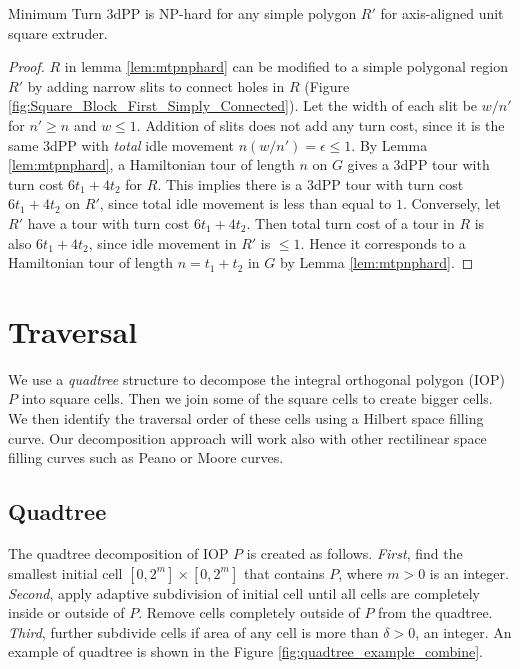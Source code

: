 \begin{cor} \label{cor:nphardsplpoly}
  Minimum Turn 3dPP is NP-hard for any simple polygon $R'$ for axis-aligned unit square extruder.
\end{cor}
\begin{proof}
  $R$ in lemma \ref{lem:mtpnphard} can be modified to a simple polygonal region $R'$ by adding narrow slits to connect holes in $R$ (Figure \ref{fig:Square_Block_First_Simply_Connected}).
  Let the width of each slit be $w/n'$ for $n' \geq n$ and $w \leq 1$.
  Addition of slits does not add any turn cost, since it is the same 3dPP with {\it total} idle movement $n(w/n') = \epsilon \leq 1$. 
  By Lemma \ref{lem:mtpnphard}, a Hamiltonian tour of length $n$ on $G$ gives a 3dPP tour with turn cost $6t_1 + 4t_2 $ for $R$. 
  This implies there is a 3dPP tour with turn cost $6t_1 + 4t_2$ on $R'$, since total idle movement is less than equal to $1$.
  Conversely, let $R'$ have a tour with turn cost $6t_1 + 4t_2$.
  Then total turn cost of a tour in $R$ is also $6t_1 + 4t_2$, since idle movement in $R'$ is $\leq 1$. 
  Hence it corresponds to a Hamiltonian tour of length $n = t_1 + t_2$ in $G$ by Lemma \ref{lem:mtpnphard}.
\end{proof}
\section{Traversal} \label{sec:travseral}

We use a {\it quadtree} structure to decompose the integral orthogonal polygon (IOP) $P$ into square cells.
Then we join some of the square cells to create bigger cells.
We then identify the traversal order of these cells using a Hilbert space filling curve.
Our decomposition approach will work also with other rectilinear space filling curves such as Peano or Moore curves.
\subsection{Quadtree}\label{ssec:quadtree}
The quadtree decomposition of IOP $P$ is created as follows.
\textit{First}, find the smallest initial cell $[0, 2^m] \times [0, 2^m]$ that contains $P$, where $m>0$ is an integer.
\textit{Second}, apply adaptive subdivision of initial cell until all cells are completely inside or outside of $P$.
Remove cells completely outside of $P$ from the quadtree.
\textit{Third}, further subdivide cells if area of any cell is more than $\delta > 0$, an integer.
An example of quadtree is shown in the Figure \ref{fig:quadtree_example_combine}.

